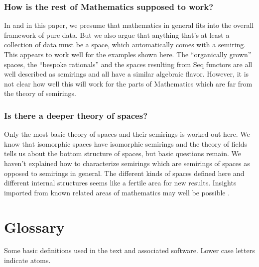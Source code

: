 \documentclass[11pt]{article}
\begin{document}
\subsubsection{How is the rest of Mathematics supposed to work?}

In \cite{PDF} and in this paper, we presume that mathematics in general fits into the overall framework of pure data.  
But we also argue that anything that's at least a collection of data must be a space, which automatically comes
with a semiring.  This appears to work well for the examples shown here.  The ``organically grown'' 
spaces, the ``bespoke rationals'' and the spaces resulting from Seq functors are all well described as semirings and 
all have a similar algebraic flavor.  However, it is not clear how well this will work for the parts of Mathematics 
which are far from the theory of semirings.

\subsubsection{Is there a deeper theory of spaces?}

Only the most basic theory of spaces and their semirings is worked out here.  We know that isomorphic spaces have isomorphic semirings 
and the theory of fields tells us about the bottom structure of spaces, but basic questions remain.  We haven't explained how to characterize
semirings which are semirings of spaces as opposed to semirings in general.  The different kinds of spaces defined here and different 
internal structures seems like a fertile area for new results.   Insights imported from known related areas of mathematics 
may well be possible \cite{golan1999,kuich1986,howie1995,semigroup,eilenberg1976,baader1998,dershowitz1990}.

\section{Glossary}
Some basic definitions used in the text and associated software\cite{coda}.  Lower case letters indicate atoms. 
\end{document}
